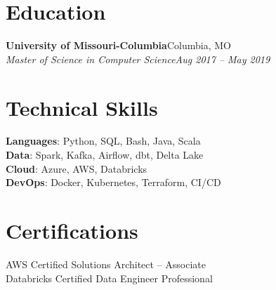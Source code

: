 \documentclass[letterpaper,11pt]{article}
\newcommand{\resumeSubheading}[4]{\item\small{\textbf{#1}\hfill #2 \\ \textit{#3}\hfill \textit{#4}}}
\begin{document}
\section{Education}
  \resumeSubheading
    {University of Missouri-Columbia}{Columbia, MO}
    {Master of Science in Computer Science}{Aug 2017 -- May 2019}

\section{Technical Skills}
  \textbf{Languages}: Python, SQL, Bash, Java, Scala \\
  \textbf{Data}: Spark, Kafka, Airflow, dbt, Delta Lake \\
  \textbf{Cloud}: Azure, AWS, Databricks \\
  \textbf{DevOps}: Docker, Kubernetes, Terraform, CI/CD

\section{Certifications}
  AWS Certified Solutions Architect -- Associate \\
  Databricks Certified Data Engineer Professional
\end{document}
